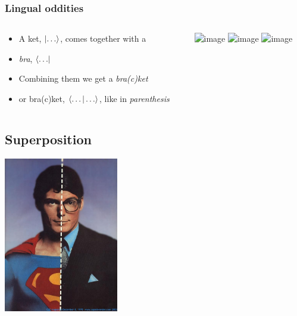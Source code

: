 \documentclass[10pt]{beamer}
\begin{document}
  \begin{frame}
    \frametitle{Lingual oddities}
    \begin{columns}
      \begin{column}{0.5\linewidth}
        \begin{itemize}
        \item<1-> A ket, $\ket{\dots}$, comes together with a 
        \item<2-> \emph{bra}, $\bra{\dots}$
        \item<3-> Combining them we get a \emph{bra(c)ket}
        \item<4-> or bra(c)ket, $\braket{\dots | \dots}$, like in \emph{parenthesis}
        \end{itemize}
      \end{column}
      \begin{column}{0.4\linewidth}
        \centering
        \includegraphics<2>[width=4cm]{img/bra.jpg}
        \includegraphics<3>[width=4cm]{img/braces.png}
        \includegraphics<4->[width=1cm]{img/brackets.png}
      \end{column}
    \end{columns}
  \end{frame}

\begin{frame}
\section{Superposition}
\centering
\includegraphics[width=5cm]{img/superman.jpg}
\end{frame}
\end{document}
